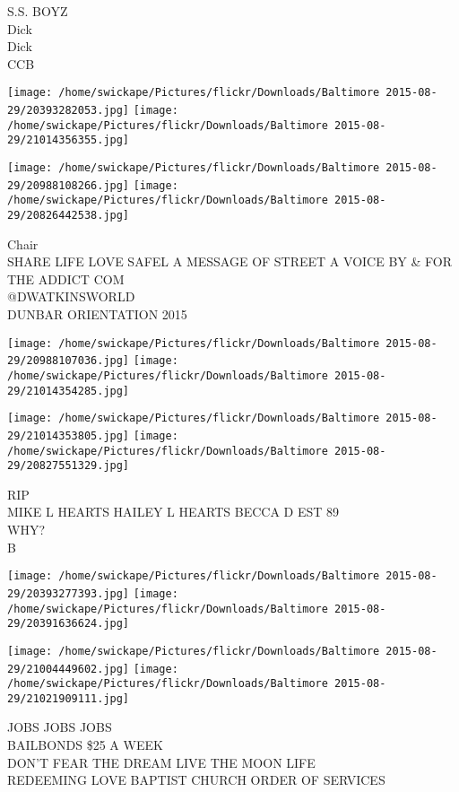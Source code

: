 \documentclass[10pt,letterpaper]{article}
\begin{document}
S.S. BOYZ\\
Dick\\
Dick\\
CCB
\pagebreak

\texttt{[image: /home/swickape/Pictures/flickr/Downloads/Baltimore 2015-08-29/20393282053.jpg]}
\texttt{[image: /home/swickape/Pictures/flickr/Downloads/Baltimore 2015-08-29/21014356355.jpg]}

\texttt{[image: /home/swickape/Pictures/flickr/Downloads/Baltimore 2015-08-29/20988108266.jpg]}
\texttt{[image: /home/swickape/Pictures/flickr/Downloads/Baltimore 2015-08-29/20826442538.jpg]}

Chair\\
SHARE LIFE LOVE SAFEL A MESSAGE OF STREET A VOICE BY \& FOR THE ADDICT COM\\
@DWATKINSWORLD\\
DUNBAR ORIENTATION 2015
\pagebreak

\texttt{[image: /home/swickape/Pictures/flickr/Downloads/Baltimore 2015-08-29/20988107036.jpg]}
\texttt{[image: /home/swickape/Pictures/flickr/Downloads/Baltimore 2015-08-29/21014354285.jpg]}

\texttt{[image: /home/swickape/Pictures/flickr/Downloads/Baltimore 2015-08-29/21014353805.jpg]}
\texttt{[image: /home/swickape/Pictures/flickr/Downloads/Baltimore 2015-08-29/20827551329.jpg]}

RIP\\
MIKE L HEARTS HAILEY L HEARTS BECCA D EST 89\\
WHY?\\
B
\pagebreak

\texttt{[image: /home/swickape/Pictures/flickr/Downloads/Baltimore 2015-08-29/20393277393.jpg]}
\texttt{[image: /home/swickape/Pictures/flickr/Downloads/Baltimore 2015-08-29/20391636624.jpg]}

\texttt{[image: /home/swickape/Pictures/flickr/Downloads/Baltimore 2015-08-29/21004449602.jpg]}
\texttt{[image: /home/swickape/Pictures/flickr/Downloads/Baltimore 2015-08-29/21021909111.jpg]}

JOBS JOBS JOBS\\
BAILBONDS \$25 A WEEK\\
DON'T FEAR THE DREAM LIVE THE MOON LIFE\\
REDEEMING LOVE BAPTIST CHURCH ORDER OF SERVICES
\pagebreak
\end{document}
